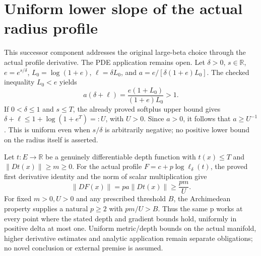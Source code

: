 \documentclass[11pt]{article}
\theoremstyle{definition}
\theoremstyle{remark}
\numberwithin{equation}{section}
\begin{document}
\clearpage
\section{Uniform lower slope of the actual radius profile}\label{profile-uniform:lower}
This successor component addresses the original large-beta choice through the actual profile derivative. The PDE application remains open.
Let $\delta>0$, $s\in\mathbb R$, $e=e^{s/\delta}$,
$L_0=\log(1+e)$, $\ell=\delta L_0$, and
$a=e/[\delta(1+e)L_0]$. The checked inequality $L_0<e$ yields
\[
 a(\delta+\ell)=\frac{e(1+L_0)}{(1+e)L_0}>1.
\]
If $0<\delta\le1$ and $s\le T$, the already proved softplus upper bound
gives $\delta+\ell\le1+\log(1+e^T)=:U$, with $U>0$.
Since $a>0$, it follows that $a\ge U^{-1}$. This is uniform even when
$s/\delta$ is arbitrarily negative; no positive lower bound on the radius
itself is asserted.

Let $t:E\to\mathbb R$ be a genuinely differentiable depth function with
$t(x)\le T$ and $\|Dt(x)\|\ge m\ge0$.
For the actual profile $F=c+p\log\ell_\delta(t)$, the proved first
derivative identity and the norm of scalar multiplication give
\[
 \|DF(x)\|=p a\|Dt(x)\|\ge\frac{p m}{U}.
\]
For fixed $m>0,U>0$ and any prescribed threshold $B$, the Archimedean
property supplies a natural $p\ge2$ with $p m/U>B$. Thus the same p
works at every point where the stated depth and gradient bounds hold,
uniformly in positive delta at most one. Uniform metric/depth bounds on
the actual manifold, higher derivative estimates and analytic application
remain separate obligations; no novel conclusion or external premise is
assumed.

\clearpage
\end{document}
